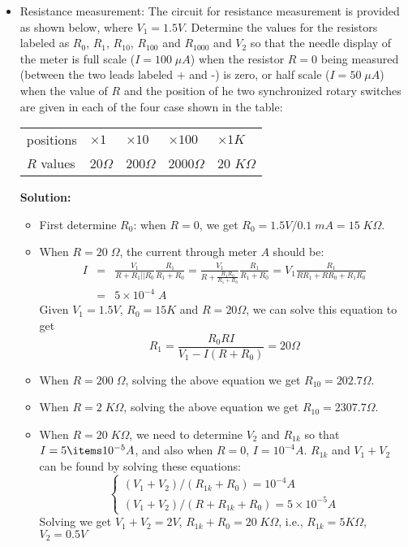 \begin{enumerate}
\begin{itemize}
    \item Resistance measurement: The circuit for resistance measurement is
      provided as shown below, where $V_1=1.5V$. Determine the values for the 
      resistors labeled as $R_0$, $R_1$, $R_{10}$, $R_{100}$ and $R_{1000}$ 
      and $V_2$ so that the needle display of the meter is full scale 
      ($I=100\;\mu A$) when the resistor $R=0$ being measured (between the 
      two leads labeled + and -) is zero, or half scale ($I=50\;\mu A$) when 
      the value of $R$ and the position of he two synchronized rotary switches
      are given in each of the four case shown in the table:

      \begin{tabular}{l|llll} \hline
	positions  & $\times 1$ & $\times 10$ & $\times 100$ & $\times 1K$ \\
	$R$ values & 20$\Omega$ & 200$\Omega$ & 2000$\Omega$ & 20 $K\Omega$ 
      \end{tabular}


      {\bf Solution:}

      \begin{itemize}
	\item First determine $R_0$: when $R=0$, we get 
	  $R_0=1.5V/0.1\;mA=15\;K\Omega$.
	\item When $R=20\;\Omega$, the current through meter $A$ should be:
	  \begin{eqnarray}
	    I&=&\frac{V_1}{R+R_1||R_0}\frac{R_1}{R_1+R_0}
	  =\frac{V_1}{R+\frac{R_1R_0}{R_1+R_0}}\frac{R_1}{R_1+R_0}
	  =V_1\frac{R_1}{RR_1+RR_0+R_1R_0} 	  \nonumber \\
	  &=&5\times 10^{-4}\;A 
	  \nonumber
	  \end{eqnarray}
	  Given $V_1=1.5V$, $R_0=15K$ and $R=20\Omega$, we can solve this 
	  equation to get 
	  \[ R_1=\frac{R_0RI}{V_1-I(R+R_0)}=20\Omega \]
	\item When $R=200\;\Omega$, solving the above equation we get 
	  $R_{10}=202.7\Omega$.
	\item When $R=2\;K\Omega$, solving the above equation we get 
	  $R_{10}=2307.7\Omega$.
	\item When $R=20\;K\Omega$, we need to determine $V_2$ and 
	  $R_{1k}$ so that $I=5\items 10^{-5} A$, and also when $R=0$, 
	  $I=10^{-4}A$. $R_{1k}$ and $V_1+V_2$ can be found by solving
	  these equations:
	  \[ \left\{ \begin{array}{l}
	    (V_1+V_2)/(R_{1k}+R_0)=10^{-4}A \\
	    (V_1+V_2)/(R+R_{1k}+R_0)=5\times 10^{-5}A
	  \end{array}\right. \]
	  Solving we get $V_1+V_2=2V$, $R_{1k}+R_0=20\;K\Omega$, i.e.,
	  $R_{1k}=5K\Omega$, $V_2=0.5V$
      \end{itemize}
     
  \end{itemize}



\end{enumerate}


